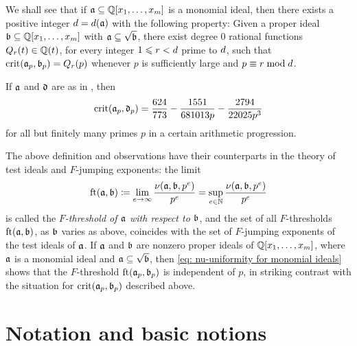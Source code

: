 \documentclass{amsart}
\begin{document}
We shall see that if $\mathfrak{a} \subseteq \mathbb{Q}[x_1,\ldots,x_m]$ is a monomial ideal, then there exists a positive integer $d = d(\mathfrak{a})$ with the following property:
Given a proper ideal $\mathfrak{b} \subseteq \mathbb{Q}[x_1,\ldots,x_m]$ with $\mathfrak{a} \subseteq \sqrt {\mathfrak{b}}$, there exist degree $0$ rational functions $Q_r(t) \in \mathbb{Q}(t)$, for every integer $1 \leqslant r < d$ prime to $d$, such that $\operatorname{crit}(\mathfrak{a}_p, \mathfrak{b}_p) = Q_r(p)$ whenever $p$ is sufficiently large and $p \equiv r \bmod d$.


\begin{example}
   If $\mathfrak{a}$ and $\mathfrak{d}$ are as in , then 
   \[
      \operatorname{crit}(\mathfrak{a}_p,\mathfrak{d}_p) =
      \frac{624}{773} - \frac{1551}{681013 p} - \frac{2794}{22025 p^3}
   \]
   for all but finitely many primes $p$ in a certain arithmetic progression.
\end{example}

The above definition and observations have their counterparts in the theory of test ideals and $F$-jumping exponents: the limit
\[
   \operatorname{ft}(\mathfrak{a}, \mathfrak{b}) \coloneqq \lim_{e\to \infty} \frac{\nu(\mathfrak{a},\mathfrak{b},p^e)}{p^e}
   = \sup_{e\in \mathbb{N}} \frac{\nu(\mathfrak{a},\mathfrak{b},p^e)}{p^e}
\]
is called the \emph{$F$-threshold of $\mathfrak{a}$ with respect to $\mathfrak{b}$}, and the set of all $F$-thresholds $\operatorname{ft}(\mathfrak{a}, \mathfrak{b})$, as $\mathfrak{b}$ varies as above, coincides with the set of $F$-jumping exponents of the test ideals of $\mathfrak{a}$.
If $\mathfrak{a}$ and $\mathfrak{b}$ are nonzero proper ideals of  $\mathbb{Q}[x_1,\ldots,x_m]$, where $\mathfrak{a}$ is a monomial ideal and $\mathfrak{a} \subseteq \sqrt {\mathfrak{b}}$, then \eqref{eq: nu-uniformity for monomial ideals} shows that the $F$-threshold $\operatorname{ft}(\mathfrak{a}_p, \mathfrak{b}_p)$ is independent of $p$, in striking contrast with the situation for $\operatorname{crit}(\mathfrak{a}_p,\mathfrak{b}_p)$ described above.


\section{Notation and basic notions}
\end{document}
